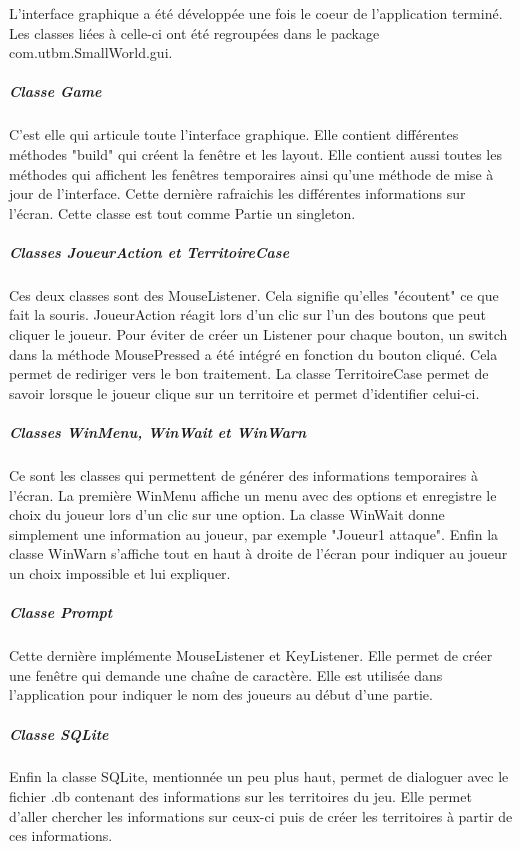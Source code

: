 \documentclass[a4paper, 11pt]{article}
\begin{document}
			 L'interface graphique a été développée une fois le coeur de l'application terminé. Les classes liées à celle-ci ont été regroupées dans le package com.utbm.SmallWorld.gui. 
			 
			 	\subparagraph{Classe Game}
			 	
			 	C'est elle qui articule toute l'interface graphique. Elle contient différentes méthodes "build" qui créent la fenêtre et les layout. Elle contient aussi toutes les méthodes qui affichent les fenêtres temporaires ainsi qu'une méthode de mise à jour de l'interface. Cette dernière rafraichis les différentes informations sur l'écran. Cette classe est tout comme Partie un singleton.
			 	
			 	\subparagraph{Classes JoueurAction et TerritoireCase}
			 	
			 	Ces deux classes sont des MouseListener. Cela signifie qu'elles "écoutent" ce que fait la souris. JoueurAction réagit lors d'un clic sur l'un des boutons que peut cliquer le joueur. Pour éviter de créer un Listener pour chaque bouton, un switch dans la méthode MousePressed a été intégré en fonction du bouton cliqué. Cela permet de rediriger vers le bon traitement. La classe TerritoireCase permet de savoir lorsque le joueur clique sur un territoire et permet d'identifier celui-ci.
			 	
			 	\subparagraph{Classes WinMenu, WinWait et WinWarn}
			 	
			 	Ce sont les classes qui permettent de générer des informations temporaires à l'écran. La première WinMenu affiche un menu avec des options et enregistre le choix du joueur lors d'un clic sur une option. La classe WinWait donne simplement une information au joueur, par exemple "Joueur1 attaque". Enfin la classe WinWarn s'affiche tout en haut à droite de l'écran pour indiquer au joueur un choix impossible et lui expliquer.
			 	
			 	\subparagraph{Classe Prompt}
			 	
			 	Cette dernière implémente MouseListener et KeyListener. Elle permet de créer une fenêtre qui demande une chaîne de caractère. Elle est utilisée dans l'application pour indiquer le nom des joueurs au début d'une partie.
			 	
			 	\subparagraph{Classe SQLite}
			 	
			 	Enfin la classe SQLite, mentionnée un peu plus haut, permet de dialoguer avec le fichier .db contenant des informations sur les territoires du jeu. Elle permet d'aller chercher les informations sur ceux-ci puis de créer les territoires à partir de ces informations.
			 	
\end{document}

